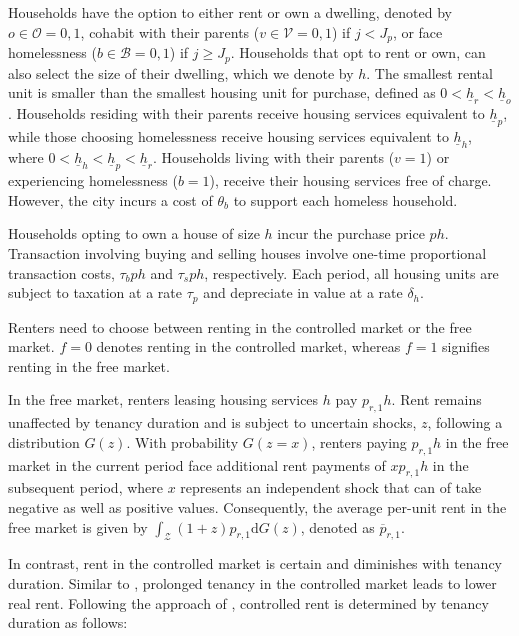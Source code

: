 \documentclass[parskip=full]{article}
\begin{document}
Households have the option to either rent or own a dwelling, denoted by $o \in \mathcal{O}={0,1}$, cohabit with their parents ($v \in \mathcal{V}={0,1}$) if $j<J_{p}$, or face homelessness ($b \in \mathcal{B}={0,1}$) if $j \geq J_{p}$. Households that opt to rent or own, can also select the size of their dwelling, which we denote by $h$. The smallest rental unit is smaller than the smallest housing unit for purchase, defined as $0<\underline{h}_{r}<\underline{h}_{o}$ \citep{gervais,sommeretal-2013,sommersullivan-2017,kaplanetal-2019}. Households residing with their parents receive housing services equivalent to $\underline{h}_{p}$, while those choosing homelessness receive housing services equivalent to $\underline{h}_{h}$, where $0<\underline{h}_{h}<\underline{h}_{p}<\underline{h}_{r}$. Households living with their parents ($v=1$) or experiencing homelessness ($b=1$), receive their housing services free of charge. However, the city incurs a cost of $\theta_{b}$ to support each homeless household.

Households opting to own a house of size $h$ incur the purchase price $p h$. Transaction involving buying and selling houses involve one-time proportional transaction costs, $\tau_{b} p h$ and $\tau_{s} p h$, respectively. Each period, all housing units are subject to taxation at a rate $\tau_{p}$ and depreciate in value at a rate $\delta_h$.

Renters need to choose between renting in the controlled market or the free market. $f=0$ denotes renting in the controlled market, whereas $f=1$ signifies renting in the free market.

In the free market, renters leasing housing services $h$ pay $p_{r,1} h$. Rent remains unaffected by tenancy duration and is subject to uncertain shocks, $z$, following a distribution $G(z)$. With probability $G(z=x)$, renters paying $p_{r,1}h$ in the free market in the current period face additional rent payments of $x p_{r,1}h$ in the subsequent period, where $x$ represents an independent shock that can of take negative as well as positive values. Consequently, the average per-unit rent in the free market is given by $\int_\mathcal{Z}(1+z)p_{r,1}\mathrm{d}G(z)$, denoted as $\overline{p}_{r,1}$.

In contrast, rent in the controlled market is certain and diminishes with tenancy duration. Similar to \citet{fmn-2023}, prolonged tenancy in the controlled market leads to lower real rent. Following the approach of \citet{fmn-2023}, controlled rent is determined by tenancy duration as follows:
\end{document}
